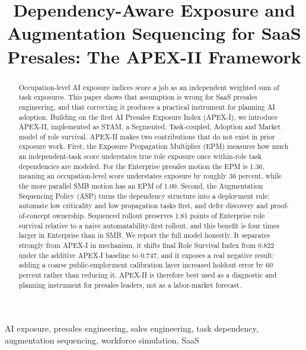 \documentclass[10pt,conference]{IEEEtran}
\title{Dependency-Aware Exposure and Augmentation Sequencing for SaaS Presales: The APEX-II Framework}
\author{\IEEEauthorblockN{Akash Anipakalu Giridhar}}
\begin{document}
\maketitle

\begin{abstract}
Occupation-level AI exposure indices score a job as an independent weighted sum of task exposures. This paper shows that assumption is wrong for SaaS presales engineering, and that correcting it produces a practical instrument for planning AI adoption. Building on the first AI Presales Exposure Index (APEX-I), we introduce APEX-II, implemented as STAM, a Segmented, Task-coupled, Adoption and Market model of role survival. APEX-II makes two contributions that do not exist in prior exposure work. First, the Exposure Propagation Multiplier (EPM) measures how much an independent-task score understates true role exposure once within-role task dependencies are modeled. For the Enterprise presales motion the EPM is 1.36, meaning an occupation-level score understates exposure by roughly 36 percent, while the more parallel SMB motion has an EPM of 1.00. Second, the Augmentation Sequencing Policy (ASP) turns the dependency structure into a deployment rule: automate low criticality and low propagation tasks first, and defer discovery and proof-of-concept ownership. Sequenced rollout preserves 1.81 points of Enterprise role survival relative to a naive automatability-first rollout, and this benefit is four times larger in Enterprise than in SMB. We report the full model honestly. It separates strongly from APEX-I in mechanism, it shifts final Role Survival Index from 0.822 under the additive APEX-I baseline to 0.747, and it exposes a real negative result: adding a coarse public-employment calibration layer increased holdout error by 60 percent rather than reducing it. APEX-II is therefore best used as a diagnostic and planning instrument for presales leaders, not as a labor-market forecast.
\end{abstract}

\begin{IEEEkeywords}
AI exposure, presales engineering, sales engineering, task dependency, augmentation sequencing, workforce simulation, SaaS
\end{IEEEkeywords}
\end{document}
